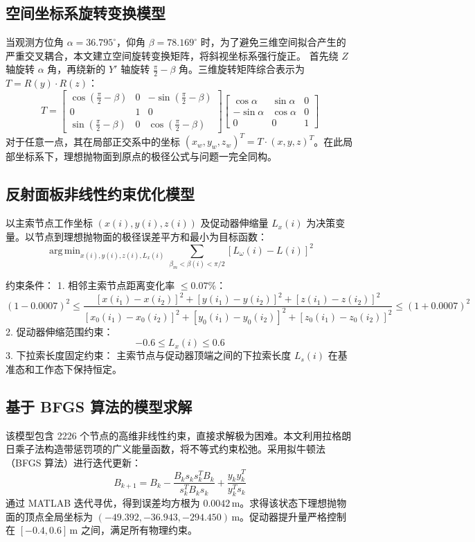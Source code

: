 \documentclass[UTF8,a4paper,zihao=-4]{ctexart}
\DeclareMathOperator*{\argmin}{arg\,min}
\begin{document}
\subsection{空间坐标系旋转变换模型}
当观测方位角 $\alpha=36.795^\circ$，仰角 $\beta=78.169^\circ$ 时，为了避免三维空间拟合产生的严重交叉耦合，本文建立空间旋转变换矩阵，将斜视坐标系强行旋正。
首先绕 $Z$ 轴旋转 $\alpha$ 角，再绕新的 $Y'$ 轴旋转 $\frac{\pi}{2}-\beta$ 角。三维旋转矩阵综合表示为 $T = R(y) \cdot R(z)$：
\begin{equation}
T = \begin{bmatrix} \cos(\frac{\pi}{2}-\beta) & 0 & -\sin(\frac{\pi}{2}-\beta) \\ 0 & 1 & 0 \\ \sin(\frac{\pi}{2}-\beta) & 0 & \cos(\frac{\pi}{2}-\beta) \end{bmatrix} \begin{bmatrix} \cos\alpha & \sin\alpha & 0 \\ -\sin\alpha & \cos\alpha & 0 \\ 0 & 0 & 1 \end{bmatrix}
\end{equation}
对于任意一点，其在局部正交系中的坐标 $(x_w, y_w, z_w)^T = T \cdot (x, y, z)^T$。在此局部坐标系下，理想抛物面到原点的极径公式与问题一完全同构。

\subsection{反射面板非线性约束优化模型}
以主索节点工作坐标 $(x(i), y(i), z(i))$ 及促动器伸缩量 $L_x(i)$ 为决策变量。以节点到理想抛物面的极径误差平方和最小为目标函数：
\begin{equation}
\argmin_{x(i), y(i), z(i), L_x(i)} \sum_{\beta_m < \beta(i) < \pi/2} [L_\omega(i) - L(i)]^2
\end{equation}

约束条件：
1. 相邻主索节点距离变化率 $\le 0.07\%$：
\begin{equation}
(1-0.0007)^2 \le \frac{[x(i_1)-x(i_2)]^2 + [y(i_1)-y(i_2)]^2 + [z(i_1)-z(i_2)]^2}{[x_0(i_1)-x_0(i_2)]^2 + [y_0(i_1)-y_0(i_2)]^2 + [z_0(i_1)-z_0(i_2)]^2} \le (1+0.0007)^2
\end{equation}
2. 促动器伸缩范围约束：
\begin{equation}
-0.6 \le L_x(i) \le 0.6
\end{equation}
3. 下拉索长度固定约束：
主索节点与促动器顶端之间的下拉索长度 $L_s(i)$ 在基准态和工作态下保持恒定。

\subsection{基于 BFGS 算法的模型求解}
该模型包含 2226 个节点的高维非线性约束，直接求解极为困难。本文利用拉格朗日乘子法构造带惩罚项的广义能量函数，将不等式约束松弛。采用拟牛顿法（BFGS 算法）进行迭代更新：
\begin{equation}
B_{k+1} = B_k - \frac{B_k s_k s_k^T B_k}{s_k^T B_k s_k} + \frac{y_k y_k^T}{y_k^T s_k}
\end{equation}
通过 MATLAB 迭代寻优，得到误差均方根为 $0.0042\,\mathrm{m}$。求得该状态下理想抛物面的顶点全局坐标为 $(-49.392, -36.943, -294.450)\,\mathrm{m}$。促动器提升量严格控制在 $[-0.4, 0.6]\,\mathrm{m}$ 之间，满足所有物理约束。
\end{document}
